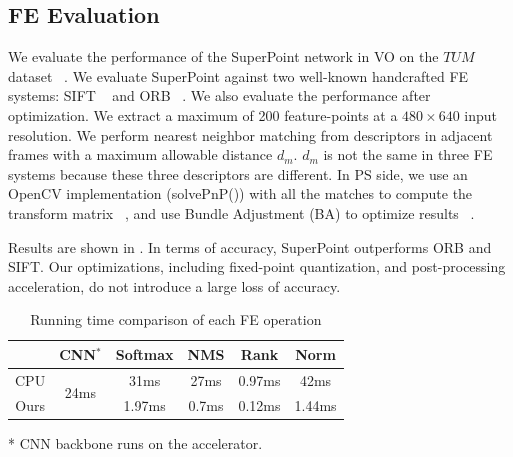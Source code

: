 

\subsection{ FE Evaluation }

We evaluate the performance of the SuperPoint network in VO on the $TUM$ dataset ~\cite{sturm12iros}. We evaluate SuperPoint against two well-known handcrafted FE systems: SIFT ~\cite{Lowe-478} and ORB ~\cite{Mur-Artal:2017281}. 
We also evaluate the performance after optimization. 
We extract a maximum of 200 feature-points at a $480\times640$ input resolution. 
We perform nearest neighbor matching from descriptors in adjacent frames with a maximum allowable distance $d_m$. $d_m$ is not the same in three FE systems because these three descriptors are different. In PS side, we use an OpenCV implementation (solvePnP()) with all the matches to compute the transform matrix  ~\cite{LepetitMoreno-Noguer-EPnP}, and use Bundle Adjustment (BA) to optimize results  ~\cite{TriggsMclauchlan-Bundle-Adjustment}. 

Results are shown in . In terms of accuracy, SuperPoint outperforms ORB and SIFT. Our optimizations, including fixed-point quantization, and post-processing acceleration, do not introduce a large loss of accuracy. 

\begin{table}[t]
  \centering
  \setlength{\abovecaptionskip}{2pt}
  \caption{Running time comparison of each FE operation}
    \begin{threeparttable}
\begin{tabular}{|c|c|c|c|c|c|}
  \hline
             &CNN$^*$ &    Softmax &        NMS &       Rank &  Norm \\
  \hline
         CPU & \multirow{2}{*}{24ms} &      31ms &       27ms &       0.97ms &       42ms \\
  \cline{1-1} \cline{3-6}
    Ours & \multirow{2}{*}{} &    1.97ms &      0.7ms &     0.12ms &     1.44ms \\
  \hline
  \end{tabular} 
  \small
\begin{tablenotes}
   \item[*] CNN backbone runs on the accelerator.  
\end{tablenotes}
    \end{threeparttable}
  
  \label{tab:optimization}%
\end{table}%

